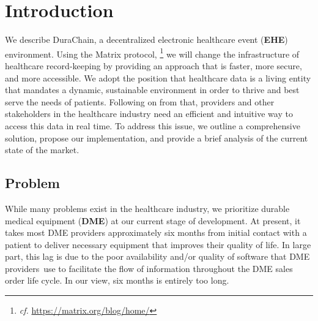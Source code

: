 \documentclass[letterpaper]{article}
\begin{document}



\section{Introduction}
We describe DuraChain, a decentralized electronic healthcare event (\textbf{EHE}) environment. Using the Matrix protocol,
\footnote{\textit{cf.} \url{https://matrix.org/blog/home/}}
we will change the infrastructure of healthcare record-keeping by providing an approach that is faster, more secure, and more accessible. We adopt the position that healthcare data is a living entity that mandates a dynamic, sustainable environment in order to thrive and best serve the needs of patients. Following on from that, providers and other stakeholders in the healthcare industry need an efficient and intuitive way to access this data in real time. To address this issue, we outline a comprehensive solution, propose our implementation, and provide a brief analysis of the current state of the market.%

\subsection{Problem}
While many problems exist in the healthcare industry, we prioritize durable medical equipment (\textbf{DME}) at our current stage of development. At present, it takes most DME providers approximately six months from initial contact with a patient to deliver necessary equipment that improves their quality of life. In large part, this lag is due to the poor availability and/or quality of software that DME providers use to facilitate the flow of information throughout the DME sales order life cycle. In our view, six months is entirely too long.%
\end{document}

